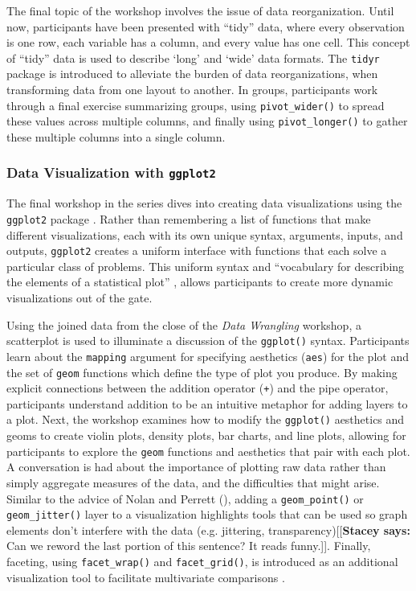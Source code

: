 \documentclass[12pt]{article}
\newcommand{\stacey}[1]{{\color{purple}[[\textbf{Stacey says: }#1]]}}
\begin{document}
\quad The final topic of the workshop involves the issue of data reorganization.
Until now, participants have been presented with ``tidy'' data, where every
observation is one row, each variable has a column, and every value has one
cell. This concept of ``tidy'' data is used to describe `long' and `wide' data
formats. The \texttt{tidyr} package is introduced to alleviate the burden of
data reorganizations, when transforming data from one layout to another. In
groups, participants work through a final exercise summarizing groups, using 
\texttt{pivot\_wider()} to spread these values across multiple columns, and
finally using \texttt{pivot\_longer()} to gather these multiple columns
into a single column.

\subsubsection{Data Visualization with \texttt{ggplot2}}
\label{sec:vizual} 

\quad The final workshop in the series dives into creating data visualizations
using the \texttt{ggplot2} package \citep{ggplot}. Rather than remembering a
list of functions that make different visualizations, each with its own unique
syntax, arguments, inputs, and outputs, \texttt{ggplot2} creates a uniform
interface with functions that each solve a particular class of problems. This
uniform syntax and ``vocabulary for describing the elements of a statistical 
plot'' \citep[p.\ 261]{nolan-viz}, allows participants to create more dynamic 
visualizations out of the gate. 

\quad Using the joined data from the close of the \emph{Data Wrangling} 
workshop, a scatterplot is used to illuminate a discussion of the
\texttt{ggplot()} syntax. Participants learn about the \texttt{mapping} argument
for specifying aesthetics (\texttt{aes}) for the plot and the set of 
\texttt{geom} functions which define the type of plot you produce. By making
explicit connections between the addition operator (\texttt{+}) and the pipe
operator, participants understand addition to be an intuitive metaphor for
adding layers to a plot. Next, the workshop examines how to modify the
\texttt{ggplot()} aesthetics and geoms to create violin plots, density plots, 
bar charts, and line plots, allowing for participants to explore the 
\texttt{geom} functions and aesthetics that pair with each plot. A conversation
is had about the importance of plotting raw data rather than simply aggregate
measures of the data, and the difficulties that might arise. Similar to the
advice of Nolan and Perrett (\citeyear{nolan-viz}), adding a 
\texttt{geom\_point()} or \texttt{geom\_jitter()} layer to a visualization
highlights tools that can be used so graph elements don't interfere with the
data (e.g. jittering, transparency)\stacey{Can we reword the last portion of this sentence?
It reads funny.}. Finally, faceting, using 
\texttt{facet\_wrap()} and \texttt{facet\_grid()}, is introduced as an
additional visualization tool to facilitate multivariate comparisons
\citep[p.\ 261]{nolan-viz}. 
\end{document}
